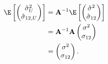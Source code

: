 \documentclass[11pt]{article}
\begin{document}
\begin{align*}
  \E \left[
  \begin{pmatrix}
    \hat{\sigma}^2_U \\
    \hat{\sigma}_{12,U}
  \end{pmatrix}
  \right]
  &=
    \mathbf{A}^{-1}
    \E \left[
    \begin{pmatrix}
      \hat{\sigma}^2 \\
      \hat{\sigma}_{12}
    \end{pmatrix}
    \right]
  \\
  &=
    \mathbf{A}^{-1}
    \mathbf{A}
    \begin{pmatrix}
      \sigma^2 \\
      \sigma_{12}
    \end{pmatrix}
  \\
  &=
    \begin{pmatrix}
      \sigma^2 \\
      \sigma_{12}
    \end{pmatrix}
    .
\end{align*}
\end{document}
